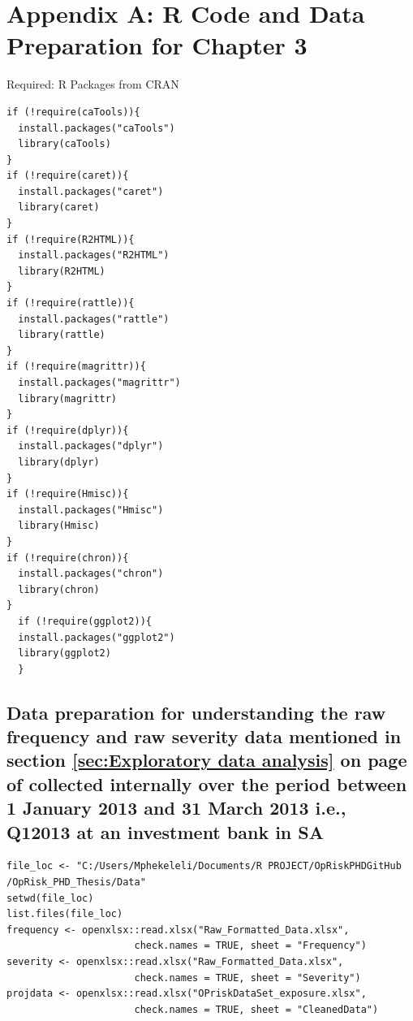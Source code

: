 \documentclass{DissertateUSU}
\begin{document}
\clearpage

\doublespacing

\section{Appendix A: R Code and Data Preparation for Chapter 3}
\label{sec:Appendix A: R Code and Data Preparation for Chapter 3}

\singlespace

Required: R Packages from CRAN

\small

\begin{verbatim}
if (!require(caTools)){
  install.packages("caTools")
  library(caTools)
}
if (!require(caret)){
  install.packages("caret")
  library(caret)
}
if (!require(R2HTML)){
  install.packages("R2HTML")
  library(R2HTML)
}
if (!require(rattle)){
  install.packages("rattle")
  library(rattle)
}
if (!require(magrittr)){
  install.packages("magrittr")
  library(magrittr)
}
if (!require(dplyr)){
  install.packages("dplyr")
  library(dplyr)
}
if (!require(Hmisc)){
  install.packages("Hmisc")
  library(Hmisc)
}
if (!require(chron)){
  install.packages("chron")
  library(chron)
}  
  if (!require(ggplot2)){
  install.packages("ggplot2")
  library(ggplot2)
  }
\end{verbatim}

\normalsize

\subsection{Data preparation for understanding the raw frequency and raw severity data mentioned in
section \ref{sec:Exploratory data analysis} on page \pageref{sec:Exploratory data analysis} of collected internally over the period
between 1 January 2013 and 31 March 2013 i.e., Q12013 at an investment bank in SA}
\label{ssec:Data preparation raw}

\small

\begin{verbatim}
file_loc <- "C:/Users/Mphekeleli/Documents/R PROJECT/OpRiskPHDGitHub
/OpRisk_PHD_Thesis/Data"
setwd(file_loc)
list.files(file_loc)
frequency <- openxlsx::read.xlsx("Raw_Formatted_Data.xlsx",
                      check.names = TRUE, sheet = "Frequency")
severity <- openxlsx::read.xlsx("Raw_Formatted_Data.xlsx",
                      check.names = TRUE, sheet = "Severity")
projdata <- openxlsx::read.xlsx("OPriskDataSet_exposure.xlsx",
                      check.names = TRUE, sheet = "CleanedData")
\end{verbatim}
\end{document}
